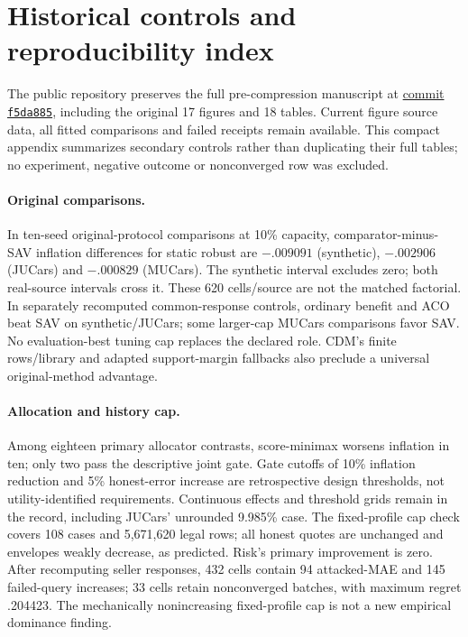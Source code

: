 \documentclass[11pt]{article}
\begin{document}
\section{Historical controls and reproducibility index}\label{app:evidence}
The public repository preserves the full pre-compression manuscript at
\href{https://github.com/T0Q0R/secondhand-valuation-research/tree/f5da885b4670dba185930237776d2c779954c11b}{commit \texttt{f5da885}},
including the original 17 figures and 18 tables. Current figure source data,
all fitted comparisons and failed receipts remain available. This compact
appendix summarizes secondary controls rather than duplicating their full
tables; no experiment, negative outcome or nonconverged row was excluded.

\paragraph{Original comparisons.}
In ten-seed original-protocol comparisons at 10\% capacity, comparator-minus-SAV
inflation differences for static robust are $-.009091$ (synthetic),
$-.002906$ (JUCars) and $-.000829$ (MUCars). The synthetic interval excludes
zero; both real-source intervals cross it. These 620 cells/source are not
the matched factorial. In separately recomputed common-response controls,
ordinary benefit and ACO beat SAV on synthetic/JUCars; some larger-cap
MUCars comparisons favor SAV. No evaluation-best tuning cap replaces the
declared role. CDM's finite rows/library and adapted support-margin fallbacks
also preclude a universal original-method advantage.

\paragraph{Allocation and history cap.}
Among eighteen primary allocator contrasts, score-minimax worsens inflation
in ten; only two pass the descriptive joint gate. Gate cutoffs of 10\%
inflation reduction and 5\% honest-error increase are retrospective design
thresholds, not utility-identified requirements. Continuous effects and
threshold grids remain in the record, including JUCars' unrounded 9.985\%
case. The fixed-profile cap check covers 108 cases and 5,671,620 legal rows;
all honest quotes are unchanged and envelopes weakly decrease, as predicted.
Risk's primary improvement is zero. After recomputing seller responses,
432 cells contain 94 attacked-MAE and 145 failed-query increases; 33 cells
retain nonconverged batches, with maximum regret .204423. The mechanically
nonincreasing fixed-profile cap is not a new empirical dominance finding.
\end{document}
